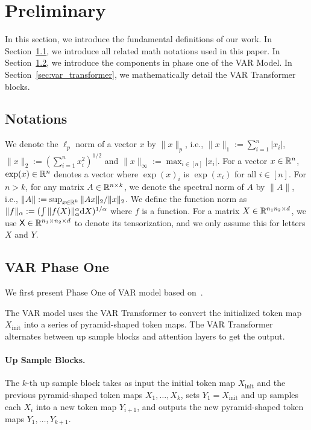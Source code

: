 \section{Preliminary}\label{sec:prelim}
In this section, we introduce the fundamental definitions of our work. 
In Section~\ref{sec:notations}, we introduce all related math notations used in this paper.
In Section~\ref{sec:var_phase1}, we introduce the components in phase one of the VAR Model. 
In Section~\ref{sec:var_transformer}, we mathematically detail the VAR Transformer blocks. 

\subsection{Notations}\label{sec:notations}

We denote the $\ell_p$ norm of a vector $x$ by $\| x \|_p$, i.e., $\|x\|_1 := \sum_{i=1}^n |x_i|$, $\| x \|_2 := (\sum_{i=1}^n x_i^2)^{1/2}$ and $\| x \|_{\infty} := \max_{i \in [n]} |x_i|$. For a vector $x \in \mathbb{R}^n$, $\exp(x) \in \mathbb{R}^n$ denotes a vector where $\exp(x)_i$ is $\exp(x_i)$ for all $i \in [n]$. For $n > k$, for any matrix $A \in \mathbb{R}^{n\times k}$, we denote the spectral norm of $A$ by $\| A \|$, i.e., $\| A \| := \sup_{x\in \mathbb{R}^k} \| Ax \|_2 / \| x \|_2$. We define the function norm as $\| f \|_\alpha :=  (\int \| f(X) \|_\alpha^\alpha \mathrm{d} X)^{1/\alpha}$ where $f$ is a function. For a matrix $X \in \mathbb{R}^{n_1 n_2 \times d}$, we use $\mathsf{X} \in \mathbb{R}^{n_1 \times n_2 \times d}$ to denote its tensorization, and we only assume this for letters $X$ and $Y$.



\subsection{VAR Phase One}\label{sec:var_phase1} \label{sec:phase_1}

We first present Phase One of VAR model based on~\cite{kll+25}.

The VAR model uses the VAR Transformer to convert the initialized token map $X_{\mathrm{init}}$ into a series of pyramid-shaped token maps. 
The VAR Transformer alternates between up sample blocks and attention layers to get the output. 


\paragraph{Up Sample Blocks.} 
The $k$-th up sample block takes as input the initial token map $X_{\mathrm{init}}$ and the previous pyramid-shaped token maps $X_1, \ldots, X_k$, sets $Y_1 = X_{\mathrm{init}}$ and up samples each $X_i$ into a new token map $Y_{i+1}$, and outputs the new pyramid-shaped token maps $Y_1, \ldots, Y_{k+1}$.  


